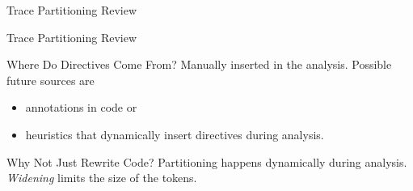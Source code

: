 \documentclass{beamer}
\begin{document}
\begin{section}{Trace Partitioning Review}

	\begin{frame}[t]{Trace Partitioning Review}
		\begin{block}{Where Do Directives Come From?}
			Manually inserted in the analysis. Possible future sources are
			\begin{itemize}
				\item annotations in code or
				\item heuristics that dynamically insert directives during analysis.
			\end{itemize}
		\end{block}

		\begin{block}{Why Not Just Rewrite Code?}
			Partitioning happens dynamically during analysis. \emph{Widening} limits the size of the tokens.
		\end{block}
	\end{frame}

\end{section}

\end{document}
